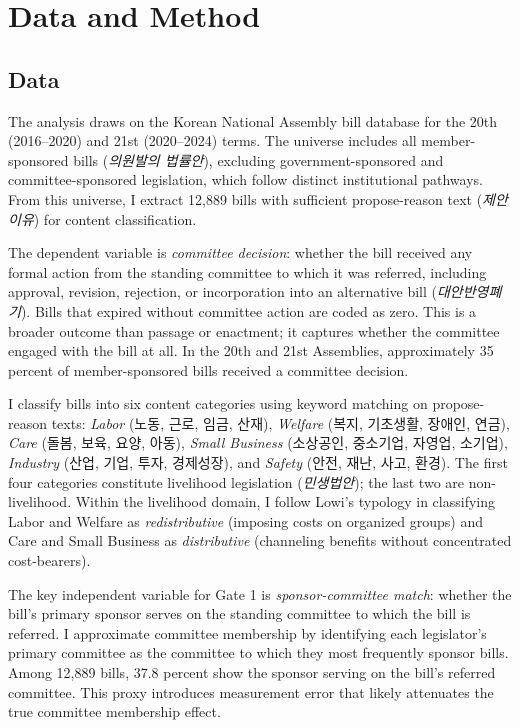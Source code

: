 \documentclass[11pt]{article}
\begin{document}
\section{Data and Method}

\subsection{Data}

The analysis draws on the Korean National Assembly bill database for the 20th (2016--2020) and 21st (2020--2024) terms. The universe includes all member-sponsored bills (\emph{의원발의 법률안}), excluding government-sponsored and committee-sponsored legislation, which follow distinct institutional pathways. From this universe, I extract 12,889 bills with sufficient propose-reason text (\emph{제안이유}) for content classification.

The dependent variable is \emph{committee decision}: whether the bill received any formal action from the standing committee to which it was referred, including approval, revision, rejection, or incorporation into an alternative bill (\emph{대안반영폐기}). Bills that expired without committee action are coded as zero. This is a broader outcome than passage or enactment; it captures whether the committee engaged with the bill at all. In the 20th and 21st Assemblies, approximately 35 percent of member-sponsored bills received a committee decision.

I classify bills into six content categories using keyword matching on propose-reason texts: \emph{Labor} (노동, 근로, 임금, 산재), \emph{Welfare} (복지, 기초생활, 장애인, 연금), \emph{Care} (돌봄, 보육, 요양, 아동), \emph{Small Business} (소상공인, 중소기업, 자영업, 소기업), \emph{Industry} (산업, 기업, 투자, 경제성장), and \emph{Safety} (안전, 재난, 사고, 환경). The first four categories constitute livelihood legislation (\emph{민생법안}); the last two are non-livelihood. Within the livelihood domain, I follow Lowi's typology in classifying Labor and Welfare as \emph{redistributive} (imposing costs on organized groups) and Care and Small Business as \emph{distributive} (channeling benefits without concentrated cost-bearers).

The key independent variable for Gate 1 is \emph{sponsor-committee match}: whether the bill's primary sponsor serves on the standing committee to which the bill is referred. I approximate committee membership by identifying each legislator's primary committee as the committee to which they most frequently sponsor bills. Among 12,889 bills, 37.8 percent show the sponsor serving on the bill's referred committee. This proxy introduces measurement error that likely attenuates the true committee membership effect.
\end{document}
